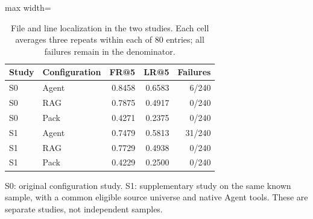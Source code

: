 \begin{table}[t]
\centering
\caption{File and line localization in the two studies. Each cell averages three repeats within each of 80 entries; all failures remain in the denominator.}\label{tab:means}
\small
\begin{adjustbox}{max width=\columnwidth}\begin{tabular}{llrrr}
\toprule
Study & Configuration & FR@5 & LR@5 & Failures \\
\midrule
S0 & Agent & 0.8458 & 0.6583 & 6/240 \\
S0 & RAG & 0.7875 & 0.4917 & 0/240 \\
S0 & Pack & 0.4271 & 0.2375 & 0/240 \\
S1 & Agent & 0.7479 & 0.5813 & 31/240 \\
S1 & RAG & 0.7729 & 0.4938 & 0/240 \\
S1 & Pack & 0.4229 & 0.2500 & 0/240 \\
\bottomrule
\end{tabular}\end{adjustbox}
\par\vspace{3pt}\begin{minipage}{\columnwidth}\footnotesize S0: original configuration study. S1: supplementary study on the same known sample, with a common eligible source universe and native Agent tools. These are separate studies, not independent samples.\end{minipage}
\end{table}
